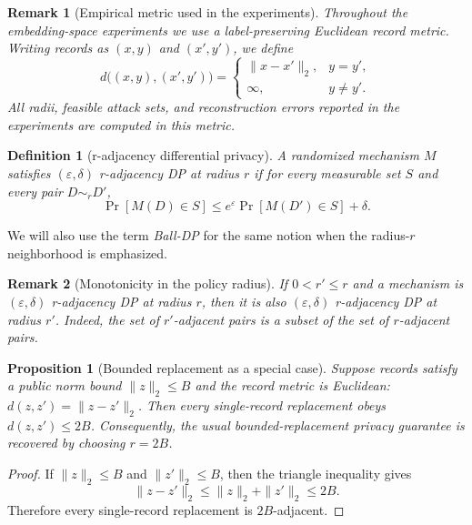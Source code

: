 \documentclass[conference,compsoc]{IEEEtran}
\newtheorem{definition}{Definition}
\newtheorem{proposition}{Proposition}
\newtheorem{remark}{Remark}
\begin{document}
\begin{remark}[Empirical metric used in the experiments]
\label{rem:label-preserving-metric}
Throughout the embedding-space experiments we use a label-preserving Euclidean record metric. Writing records as $(x,y)$ and $(x',y')$, we define
\[
d\big((x,y),(x',y')\big)=
\begin{cases}
\|x-x'\|_2, & y=y',\\
\infty, & y\neq y'.
\end{cases}
\]
All radii, feasible attack sets, and reconstruction errors reported in the experiments are computed in this metric.
\end{remark}

\begin{definition}[r-adjacency differential privacy]
A randomized mechanism $M$ satisfies \emph{$(\varepsilon,\delta)$ r-adjacency DP at radius $r$} if for every measurable set $S$ and every pair $D\sim_r D'$,
\[
\Pr[M(D)\in S]\le e^{\varepsilon}\Pr[M(D')\in S]+\delta.
\]
\end{definition}

We will also use the term \emph{Ball-DP} for the same notion when the radius-$r$ neighborhood is emphasized.

\begin{remark}[Monotonicity in the policy radius]
If $0<r'\le r$ and a mechanism is $(\varepsilon,\delta)$ r-adjacency DP at radius $r$, then it is also $(\varepsilon,\delta)$ r-adjacency DP at radius $r'$. Indeed, the set of $r'$-adjacent pairs is a subset of the set of $r$-adjacent pairs.
\end{remark}

\begin{proposition}[Bounded replacement as a special case]
Suppose records satisfy a public norm bound $\|z\|_2\le B$ and the record metric is Euclidean: $d(z,z')=\|z-z'\|_2$. Then every single-record replacement obeys $d(z,z')\le 2B$. Consequently, the usual bounded-replacement privacy guarantee is recovered by choosing $r=2B$.
\end{proposition}

\begin{proof}
If $\|z\|_2\le B$ and $\|z'\|_2\le B$, then the triangle inequality gives
\[
\|z-z'\|_2\le \|z\|_2+\|z'\|_2\le 2B.
\]
Therefore every single-record replacement is $2B$-adjacent.
\end{proof}
\end{document}
